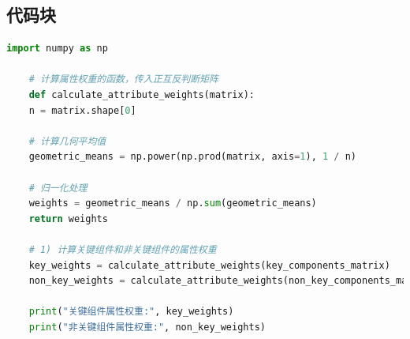 \documentclass{article}
\begin{document}
\subsection{代码块}

\begin{lstlisting}[language=Python]
	import numpy as np
	
	# 计算属性权重的函数，传入正互反判断矩阵
	def calculate_attribute_weights(matrix):
	n = matrix.shape[0]
	
	# 计算几何平均值
	geometric_means = np.power(np.prod(matrix, axis=1), 1 / n)
	
	# 归一化处理
	weights = geometric_means / np.sum(geometric_means)
	return weights
	
	# 1) 计算关键组件和非关键组件的属性权重
	key_weights = calculate_attribute_weights(key_components_matrix)
	non_key_weights = calculate_attribute_weights(non_key_components_matrix)
	
	print("关键组件属性权重:", key_weights)
	print("非关键组件属性权重:", non_key_weights)
\end{lstlisting}
\end{document}
